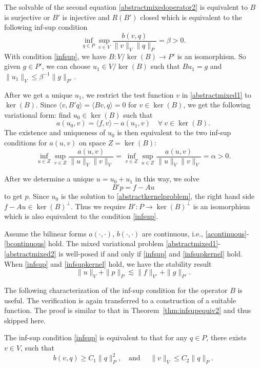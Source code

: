 The solvable of the second equation \eqref{abstractmixedoperator2} is equivalent to $B$ is surjective or $B'$ is injective
and $R(B')$ closed which is equivalent to the following inf-sup condition
\begin{equation}\label{infsup}
\inf_{q\in P}\sup_{v\in V}\frac{b(v, q)}{\|v\|_V\|q\|_P}=\beta>0.
\end{equation}
With condition \eqref{infsup}, we have $B : V/\ker(B)\to P'$ is an isomorphism. So given $g\in P'$, we
can choose $u_1\in V/\ker(B)$ such that $Bu_1 = g$ and $\|u_1\|_V\leq \beta^{-1}\|g\|_{P'}$.

After we get a unique $u_1$, we restrict the test function $v$ in \eqref{abstractmixed1} to $\ker(B)$. Since
$\langle v, B'q\rangle = \langle Bv, q\rangle = 0$ for $v\in \ker(B)$, we get the following variational form: find
$u_0\in \ker(B)$ such that
\begin{equation}\label{abstractkernelproblem}
a(u_0, v) = \langle f, v\rangle- a(u_1, v)\quad \forall~v \in \ker(B).
\end{equation}
The existence and uniqueness of $u_0$ is then equivalent to the two inf-sup conditions for
$a(u, v)$ on space $Z = \ker(B)$:
\begin{equation}\label{infsupkernel}
\inf_{u\in Z}\sup_{v\in Z}\frac{a(u, v)}{\|u\|_V\|v\|_V}=\inf_{v\in Z}\sup_{u\in Z}\frac{a(u, v)}{\|u\|_V\|v\|_V}=\alpha>0.
\end{equation}

After we determine a unique $u = u_0 + u_1$ in this way, we solve
\[
B'p = f - Au
\]
to get $p$. Since $u_0$ is the solution to \eqref{abstractkernelproblem}, the right hand side $f - Au \in \ker(B)^{\perp}$. Thus we
require $B': P\to \ker(B)^{\perp}$ is an isomorphism which is also equivalent to the condition \eqref{infsup}.

\begin{theorem}
Assume the bilinear forms $a(\cdot, \cdot)$, $b(\cdot, \cdot)$ are continuous, i.e., \eqref{acontinuous}-\eqref{bcontinuous} hold. The
mixed variational problem \eqref{abstractmixed1}-\eqref{abstractmixed2} is well-posed if and only if \eqref{infsup} and \eqref{infsupkernel} hold. When \eqref{infsup} and \eqref{infsupkernel} hold, we have the stability result
\[
\|u\|_V+\|p\|_P\lesssim \|f\|_{V'}+\|g\|_{P'}.
\]
\end{theorem}

The following characterization of the inf-sup condition for the operator $B$ is useful. The
verification is again transferred to a construction of a suitable function.
The proof is similar to that in Theorem~\ref{thm:infsupequiv2} and thus skipped here.
\begin{theorem}
The inf-sup condition \eqref{infsup} is equivalent to that for any $q\in P$, there exists
$v\in V$, such that
\begin{equation*}%
b(v, q)\geq C_1\|q\|_P^2,\quad\textrm{and } \quad\|v\|_V\leq C_2\|q\|_P.
\end{equation*}
\end{theorem}


